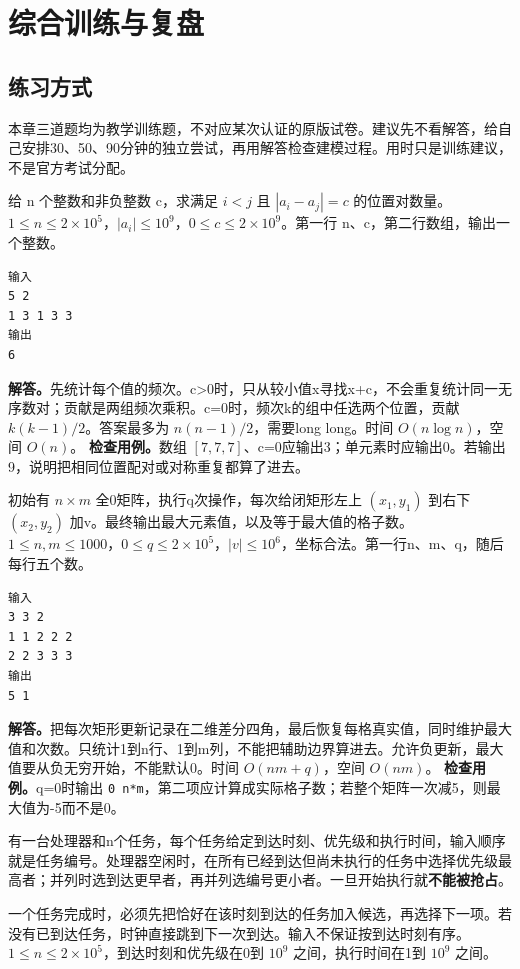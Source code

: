 \section{综合训练与复盘}
\subsection{练习方式}
本章三道题均为教学训练题，不对应某次认证的原版试卷。建议先不看解答，给自己安排30、50、90分钟的独立尝试，再用解答检查建模过程。用时只是训练建议，不是官方考试分配。

给 n 个整数和非负整数 c，求满足 $i<j$ 且 $|a_i-a_j|=c$ 的位置对数量。$1\le n\le2\times10^5$，$|a_i|\le10^9$，$0\le c\le2\times10^9$。第一行 n、c，第二行数组，输出一个整数。
\begin{verbatim}
输入
5 2
1 3 1 3 3
输出
6
\end{verbatim}
\textbf{解答。}先统计每个值的频次。c>0时，只从较小值x寻找x+c，不会重复统计同一无序数对；贡献是两组频次乘积。c=0时，频次k的组中任选两个位置，贡献 $k(k-1)/2$。答案最多为 $n(n-1)/2$，需要long long。时间 $O(n\log n)$，空间 $O(n)$。
\textbf{检查用例。}数组 $[7,7,7]$、c=0应输出3；单元素时应输出0。若输出9，说明把相同位置配对或对称重复都算了进去。

初始有 $n\times m$ 全0矩阵，执行q次操作，每次给闭矩形左上 $(x_1,y_1)$ 到右下 $(x_2,y_2)$ 加v。最终输出最大元素值，以及等于最大值的格子数。$1\le n,m\le1000$，$0\le q\le2\times10^5$，$|v|\le10^6$，坐标合法。第一行n、m、q，随后每行五个数。
\begin{verbatim}
输入
3 3 2
1 1 2 2 2
2 2 3 3 3
输出
5 1
\end{verbatim}
\textbf{解答。}把每次矩形更新记录在二维差分四角，最后恢复每格真实值，同时维护最大值和次数。只统计1到n行、1到m列，不能把辅助边界算进去。允许负更新，最大值要从负无穷开始，不能默认0。时间 $O(nm+q)$，空间 $O(nm)$。
\textbf{检查用例。}q=0时输出 \texttt{0 n*m}，第二项应计算成实际格子数；若整个矩阵一次减5，则最大值为-5而不是0。

有一台处理器和n个任务，每个任务给定到达时刻、优先级和执行时间，输入顺序就是任务编号。处理器空闲时，在所有已经到达但尚未执行的任务中选择优先级最高者；并列时选到达更早者，再并列选编号更小者。一旦开始执行就\textbf{不能被抢占}。

一个任务完成时，必须先把恰好在该时刻到达的任务加入候选，再选择下一项。若没有已到达任务，时钟直接跳到下一次到达。输入不保证按到达时刻有序。$1\le n\le2\times10^5$，到达时刻和优先级在0到 $10^9$ 之间，执行时间在1到 $10^9$ 之间。

